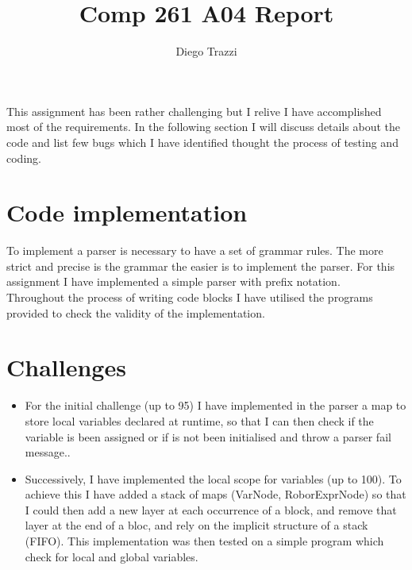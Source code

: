 \documentclass[11pt, oneside]{article} %
\title{Comp 261 A04 Report}
\author{Diego Trazzi}
\begin{document}
\maketitle
This assignment has been rather challenging but I relive I have accomplished most of the requirements. In the following section I will discuss details about the code and list few bugs which I have identified thought the process of testing and coding.
\section{Code implementation}
To implement a parser is necessary to have a set of grammar rules. The more strict and precise is the grammar the easier is to implement the parser. 
For this assignment I have implemented a simple parser with prefix notation.\\
Throughout the process of writing code blocks I have utilised the programs provided to check the validity of the implementation.
\section{Challenges}
\begin{itemize}
\item For the initial challenge (up to 95) I have implemented in the parser a map to store local variables declared at runtime, so that I can then check if the variable is been assigned or if is not been initialised and throw a parser fail message..
\item Successively, I have implemented the local scope for variables (up to 100). To achieve this I have added a stack of maps (VarNode, RoborExprNode) so that I could then add a new layer at each occurrence of a block, and remove that layer at the end of a bloc, and rely on the implicit structure of a stack (FIFO). This implementation was then tested on a simple program which check for local and global variables.
\end{itemize}
\end{document}
